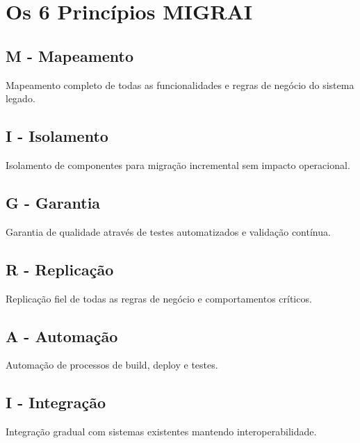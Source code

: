 \section{Os 6 Princípios MIGRAI}

\subsection{M - Mapeamento}
Mapeamento completo de todas as funcionalidades e regras de negócio do sistema legado.

\subsection{I - Isolamento}
Isolamento de componentes para migração incremental sem impacto operacional.

\subsection{G - Garantia}
Garantia de qualidade através de testes automatizados e validação contínua.

\subsection{R - Replicação}
Replicação fiel de todas as regras de negócio e comportamentos críticos.

\subsection{A - Automação}
Automação de processos de build, deploy e testes.

\subsection{I - Integração}
Integração gradual com sistemas existentes mantendo interoperabilidade.